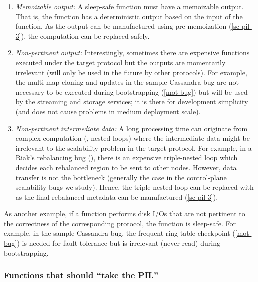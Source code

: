 \begin{enumerate}
\item {\em Memoizable output:} A sleep-safe function must have a
memoizable output.  That is, the function has a deterministic output based
on the input of the function.  As the output can be manufactured using
pre-memoization (\sec\ref{sc-pil-3}), the computation can be replaced
safely.


\item {\em Non-pertinent output:} Interestingly, sometimes there are expensive
functions executed under the target protocol but the outputs are momentarily
irrelevant (will only be used in the future by other protocols).  For example,
the multi-map cloning and updates in the sample Cassandra bug are not necessary
to be executed during bootstrapping (\sec\ref{mot-bug}) but will be used by the
streaming and storage services; it is there for development simplicity (and does
not cause problems in medium deployment scale).



\item {\em Non-pertinent intermediate data:} A long processing time can
originate from complex computation (\eg, nested  loops) where the
intermediate data might be irrelevant to the scalability problem in the
target protocol.  For example, in a Riak's rebalancing bug (\riakone),
there is an expensive triple-nested loop which decides each rebalanced
region to be sent to other nodes.  However, data transfer is not the
bottleneck (generally the case in the control-plane scalability bugs we
study).  Hence, the triple-nested loop can be replaced with \sleep as the
final rebalanced metadata can be manufactured (\sec\ref{sc-pil-3}).
\end{enumerate}

As another example, if a function performs disk I/Os that are not pertinent to
the correctness of the corresponding protocol, the function is sleep-safe.  For
example, in the sample Cassandra bug, the frequent ring-table checkpoint
(\sec\ref{mot-bug}) is needed for fault tolerance but is irrelevant (never read)
during bootstrapping.





\subsubsection{Functions that should ``take the PIL''}
\label{sc-pil-2}

